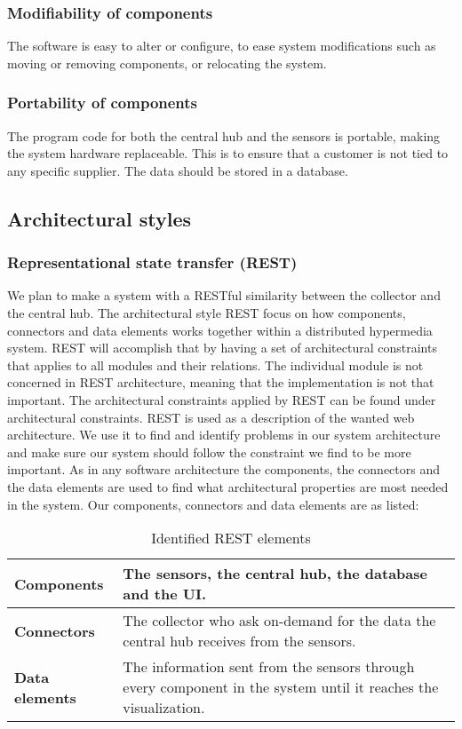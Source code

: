 \documentclass[../document.tex]{subfiles}
\begin{document}
\subsubsection{Modifiability of components}
The software is easy to alter or configure, to ease system modifications such as moving or removing components, or relocating the system.

\subsubsection{Portability of components}
The program code for both the central hub and the sensors is portable, making the system hardware replaceable. This is to ensure that a customer is not tied to any specific supplier. The data should be stored in a database.

\subsection{Architectural styles}
\subsubsection{Representational state transfer (REST)}
We plan to make a system with a RESTful similarity between the collector and the central hub. The architectural style REST focus on how components, connectors and data elements works together within a distributed hypermedia system. REST will accomplish that by having a set of architectural constraints that applies to all modules and their relations. The individual module is not concerned in REST architecture, meaning that the implementation is not that important. The architectural constraints applied by REST can be found under architectural constraints. REST is used as a description of the wanted web architecture. We use it to find and identify problems in our system architecture and make sure our system should follow the constraint we find to be more important. As in any software architecture the components, the connectors and the data elements are used to find what architectural properties are most needed in the system. Our components, connectors and data elements are as listed:

\begin{table}[H]
	\caption{Identified REST elements}
	\begin{tabularx}{\textwidth}{|X|X|}
		\hline
		\textbf{Components}		& The sensors, the central hub, the database and the UI.  \\ \hline
		\textbf{Connectors}		& The collector who ask on-demand for the data the central hub receives from the sensors.  \\ \hline
		\textbf{Data elements}	& The information sent from the sensors through every component in the system until it reaches  the visualization.  \\ \hline
	\end{tabularx}
\end{table}
\end{document}
